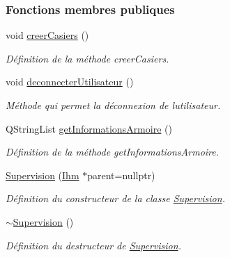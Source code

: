 \subsubsection*{Fonctions membres publiques}
\begin{DoxyCompactItemize}
\item 
void \hyperlink{class_supervision_a558665fd7e7c44653907883afd9a58bf}{creer\+Casiers} ()
\begin{DoxyCompactList}\small\item\em Définition de la méthode creer\+Casiers. \end{DoxyCompactList}\item 
void \hyperlink{class_supervision_a164a1ad89264ea252401818df325eab8}{deconnecter\+Utilisateur} ()
\begin{DoxyCompactList}\small\item\em Méthode qui permet la déconnexion de l\textquotesingle{}utilisateur. \end{DoxyCompactList}\item 
Q\+String\+List \hyperlink{class_supervision_a72bd93799fcf5423a5f0c5538d4ec892}{get\+Informations\+Armoire} ()
\begin{DoxyCompactList}\small\item\em Définition de la méthode get\+Informations\+Armoire. \end{DoxyCompactList}\item 
\hyperlink{class_supervision_af3f0ed8f5aadd6b4aa5e0eac2813d8c4}{Supervision} (\hyperlink{class_ihm}{Ihm} $\ast$parent=nullptr)
\begin{DoxyCompactList}\small\item\em Définition du constructeur de la classe \hyperlink{class_supervision}{Supervision}. \end{DoxyCompactList}\item 
\hyperlink{class_supervision_a5058e6aec3356006c8efe66bf223ec94}{$\sim$\+Supervision} ()
\begin{DoxyCompactList}\small\item\em Définition du destructeur de \hyperlink{class_supervision}{Supervision}. \end{DoxyCompactList}\end{DoxyCompactItemize}

